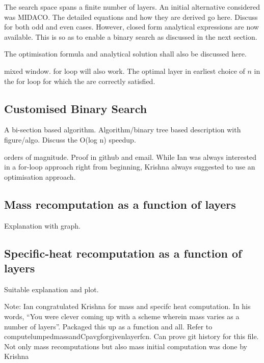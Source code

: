 The  search space  spans  a finite  number of  layers.  An initial  alternative
considered  was MIDACO.  The detailed  equations and  how they  are derived  go
here. Discuss  for both  odd and  even cases.  However, closed  form analytical
expressions are  now available.  This is  so as  to enable  a binary  search as
discussed in the next section.

The optimisation formula and analytical solution shall also be discussed here.

mixed  %
window.  for loop  will also  work.  The optimal  layer  in %
earliest choice  of $n$ in the  for loop for which  the %
are correctly satisfied.

\subsection{Customised Binary Search}

A bi-section based algorithm. Algorithm/binary tree based description with
figure/algo. Discuss the O(log n) speedup.

orders of magnitude. Proof in github  and email. While Ian was always interested
in a for-loop approach right from  beginning, Krishna always suggested to use an
optimisation approach.

\subsection{Mass recomputation as a function of layers}
Explanation with graph.

\subsection{Specific-heat recomputation as a function of layers}
Suitable explanation and plot.

Note: Ian congratulated Krishna for mass and specifc heat computation. In his
words, ``You were clever coming up with a scheme wherein mass varies as a
number of layers''. Packaged this up as a function and all. Refer to
computelumpedmassandCpavgforgivenlayerfcn. Can prove git history for this file.
Not only mass recomputations but also mass initial computation was done by
Krishna

